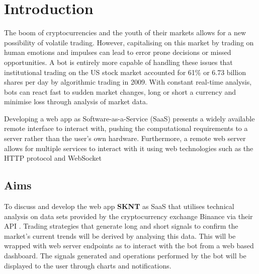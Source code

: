 
\chapter{Introduction}
\label{sec:intro}


The boom of cryptocurrencies and the youth of their markets allows for a new possibility of volatile trading. However, capitalising on this market by trading on human emotions and impulses can lead to error prone decisions or missed opportunities. A bot is entirely more capable of handling these issues that institutional trading on the US stock market accounted for 61\% or 6.73 billion shares \cite{WEB:Cheng:2017} per day by algorithmic trading in 2009. With constant real-time analysis, bots can react fast to sudden market changes, long or short a currency and minimise loss through analysis of market data. 

Developing a web app as Software-as-a-Service (SaaS) presents a widely available remote interface to interact with, pushing the computational requirements to a server rather than the user's own hardware. Furthermore, a remote web server allows for multiple services to interact with it using web technologies such as the HTTP protocol and WebSocket






\section{Aims}
\label{sec:intro:aims}
\noindent To discuss and develop the web app \textbf{SKNT} as SaaS that utilises technical analysis on data sets provided by the cryptocurrency exchange Binance via their API \cite{WEB:BINANCE_API:2018}. Trading strategies that generate long and short signals to confirm the market's current trends will be derived by analysing this data. This will be wrapped with web server endpoints as to interact with the bot from a web based dashboard. The signals generated and operations performed by the bot will be displayed to the user through charts and notifications.


